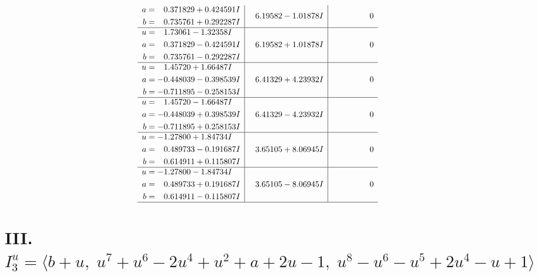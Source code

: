 \documentclass[1p]{elsarticle_modified}
\theoremstyle{definition}
\begin{document}
$$\begin{array}{c|c|c}
\begin{aligned}
a &= \phantom{-}0.371829 + 0.424591 I \\
b &= \phantom{-}0.735761 + 0.292287 I\end{aligned}
 & \phantom{-}6.19582 - 1.01878 I & \phantom{-0.000000 } 0 \\ \hline\begin{aligned}
u &= \phantom{-}1.73061 - 1.32358 I \\
a &= \phantom{-}0.371829 - 0.424591 I \\
b &= \phantom{-}0.735761 - 0.292287 I\end{aligned}
 & \phantom{-}6.19582 + 1.01878 I & \phantom{-0.000000 } 0 \\ \hline\begin{aligned}
u &= \phantom{-}1.45720 + 1.66487 I \\
a &= -0.448039 - 0.398539 I \\
b &= -0.711895 - 0.258153 I\end{aligned}
 & \phantom{-}6.41329 + 4.23932 I & \phantom{-0.000000 } 0 \\ \hline\begin{aligned}
u &= \phantom{-}1.45720 - 1.66487 I \\
a &= -0.448039 + 0.398539 I \\
b &= -0.711895 + 0.258153 I\end{aligned}
 & \phantom{-}6.41329 - 4.23932 I & \phantom{-0.000000 } 0 \\ \hline\begin{aligned}
u &= -1.27800 + 1.84734 I \\
a &= \phantom{-}0.489733 - 0.191687 I \\
b &= \phantom{-}0.614911 + 0.115807 I\end{aligned}
 & \phantom{-}3.65105 + 8.06945 I & \phantom{-0.000000 } 0 \\ \hline\begin{aligned}
u &= -1.27800 - 1.84734 I \\
a &= \phantom{-}0.489733 + 0.191687 I \\
b &= \phantom{-}0.614911 - 0.115807 I\end{aligned}
 & \phantom{-}3.65105 - 8.06945 I & \phantom{-0.000000 } 0\\
 \hline 
 \end{array}$$\newpage\newpage\renewcommand{\arraystretch}{1}
\centering \section*{III. $I^u_{3}= \langle b+u,\;u^7+u^6-2 u^4+u^2+a+2 u-1,\;u^8- u^6- u^5+2 u^4- u+1 \rangle$}
\end{document}
